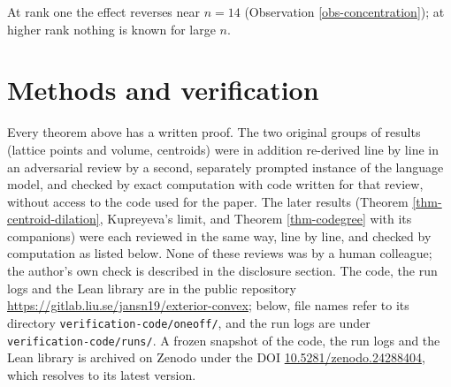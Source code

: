\documentclass[11pt, a4paper, abstract=yes]{scrartcl}
\theoremstyle{definition}
\theoremstyle{remark}
\theoremstyle{plain}
\theoremstyle{remark}
\theoremstyle{plain}
\begin{document}
At rank one the effect reverses near \(n=14\) (Observation \ref{obs-concentration}); at higher rank
nothing is known for large \(n\).
\section{Methods and verification}
\label{sec-methods}
Every theorem above has a written proof. The two original groups of results (lattice points and
volume, centroids) were in addition re-derived line by line in an adversarial review by a second,
separately prompted instance of the language model, and checked by exact computation with code
written for that review, without access to the code used for the paper. The later results
(Theorem \ref{thm-centroid-dilation}, Kupreyeva's limit, and Theorem \ref{thm-codegree} with its
companions) were each reviewed in the same way, line by line, and checked by computation as listed
below. None of these reviews was by a human colleague; the author's own check is described in the
disclosure section. The code, the run logs and the Lean library are in the public repository
\url{https://gitlab.liu.se/jansn19/exterior-convex}; below, file names refer to its directory
\texttt{verification-code/oneoff/}, and the run logs are under \texttt{verification-code/runs/}. A frozen snapshot of the code, the run logs and the Lean library is archived on Zenodo
\autocite{SnellmanZenodoSeries} under the DOI
\href{https://doi.org/10.5281/zenodo.24288404}{10.5281/zenodo.24288404}, which resolves to its latest version.

\begingroup\sloppy
\end{document}
